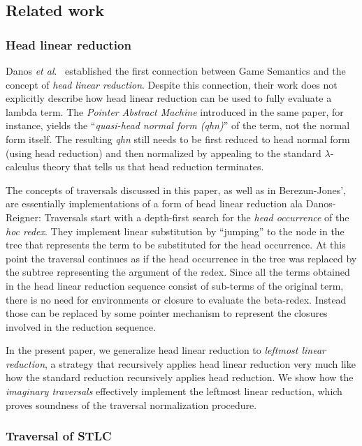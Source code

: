 \documentclass{elsarticle}
\theoremstyle{plain}
\theoremstyle{definition}
\theoremstyle{remark}
\newcommand{\etal}{\textit{et al}. }
\begin{document}
\subsection{Related work}

\subsubsection{Head linear reduction}
Danos \etal\ established the first connection between Game Semantics and the concept of \emph{head linear reduction}\cite{danos-head,danosherbelinregnier1996}. Despite this connection, their work does not explicitly describe how head linear reduction can be used to fully evaluate a lambda term. The \emph{Pointer Abstract Machine} introduced in the same paper, for instance, yields the ``\emph{quasi-head normal form (qhn)}'' of the term, not the normal form itself. The resulting \emph{qhn} still needs to be first reduced to head normal form (using head reduction) and then normalized by appealing to the standard $\lambda$-calculus theory that tells us that head reduction terminates.

The concepts of traversals discussed in this paper, as well as in Berezun-Jones'\cite{JonesBerezunLLL}, are essentially implementations of a form of head linear reduction ala Danos-Reigner: Traversals start with a depth-first search for the \emph{head occurrence} of the \emph{hoc redex}. They implement linear substitution by ``jumping'' to the node in the tree that represents the term to be substituted for the head occurrence. At this point the traversal continues as if the head occurrence in the tree was replaced by the subtree representing the argument of the redex. Since all the terms obtained in the head linear reduction sequence consist of sub-terms of the original term, there is no need for environments or closure to evaluate the beta-redex. Instead those can be replaced by some pointer mechanism to represent the closures involved in the reduction sequence.

In the present paper, we generalize head linear reduction to \emph{leftmost linear reduction}, a strategy that recursively applies head linear reduction very much like how the standard reduction recursively applies head reduction.
We show how the \emph{imaginary traversals} effectively implement the leftmost linear reduction, which proves soundness of the traversal normalization procedure.

\subsubsection{Traversal of STLC}
\end{document}

